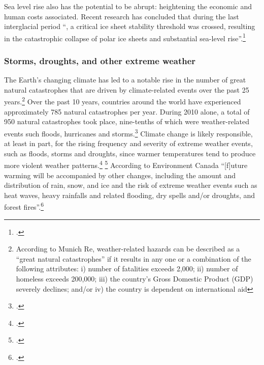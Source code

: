 Sea level rise also has the potential to be abrupt: heightening the economic and human costs associated.
Recent research has concluded that during the last interglacial period ``, a critical ice sheet stability threshold was crossed, resulting in the catastrophic collapse of polar ice sheets and substantial sea-level rise''.\footcite[][p. 1]{OLeary2013}


	
	\subsubsection{Storms, droughts, and other extreme weather}



The Earth's changing climate has led to a notable rise in the number of great natural catastrophes that are driven by climate-related events over the past 25 years.\footnote{According to Munich Re, weather-related hazards can be described as a ``great natural catastrophes'' if it results in any one or a combination of the following attributes: i) number of fatalities exceeds 2,000; ii) number of homeless exceeds 200,000; iii) the country’s Gross Domestic Product (GDP) severely declines; and/or iv) the country is dependent on international aid}
Over the past 10 years, countries around the world have experienced approximately 785 natural catastrophes per year. 
During 2010 alone, a total of 950 natural catastrophes took place, nine-tenths of which were weather-related events such floods, hurricanes and storms.\footcite[][]{MunichRECatast}
Climate change is likely responsible, at least in part, for the rising frequency and severity of extreme weather events, such as floods, storms and droughts, since warmer temperatures tend to produce more violent weather patterns.\footcite[See: ][]{IPCCHurricane} \footcite[See also: ][]{Peterson2013}
According to Environment Canada ``[f]uture warming will be accompanied by other changes, including the amount and distribution of rain, snow, and ice and the risk of extreme weather events such as heat waves, heavy rainfalls and related flooding, dry spells and/or droughts, and forest fires''.\footcite[][]{ECImpactsOfCC}



